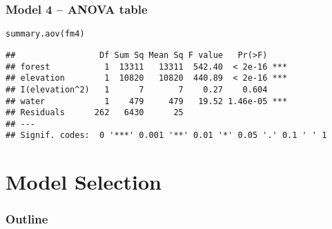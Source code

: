 \documentclass[color=usenames,dvipsnames]{beamer}\usepackage[]{graphicx}\usepackage[]{color}
\makeatletter
\newcommand{\hlstd}[1]{\textcolor[rgb]{0,0,0}{#1}}%
\newcommand{\hlkwd}[1]{\textcolor[rgb]{0.004,0.004,0.506}{#1}}%
\newenvironment{kframe}{%
 \def\at@end@of@kframe{}%
 \ifinner\ifhmode%
  \def\at@end@of@kframe{\end{minipage}}%
  \begin{minipage}{\columnwidth}%
 \fi\fi%
 \def\FrameCommand##1{\hskip\@totalleftmargin \hskip-\fboxsep
 \colorbox{shadecolor}{##1}\hskip-\fboxsep
     \hskip-\linewidth \hskip-\@totalleftmargin \hskip\columnwidth}%
 \MakeFramed {\advance\hsize-\width
   \@totalleftmargin\z@ \linewidth\hsize
   \@setminipage}}%
 {\par\unskip\endMakeFramed%
 \at@end@of@kframe}
\newenvironment{knitrout}{}{} %
\makeatother
\begin{document}
\begin{frame}[fragile]
  \frametitle{Model 4 -- ANOVA table}
\begin{knitrout}\scriptsize
{}\color{fgcolor}\begin{kframe}
\begin{alltt}
\hlkwd{summary.aov}\hlstd{(fm4)}
\end{alltt}
\begin{verbatim}
##                 Df Sum Sq Mean Sq F value   Pr(>F)    
## forest           1  13311   13311  542.40  < 2e-16 ***
## elevation        1  10820   10820  440.89  < 2e-16 ***
## I(elevation^2)   1      7       7    0.27    0.604    
## water            1    479     479   19.52 1.46e-05 ***
## Residuals      262   6430      25                     
## ---
## Signif. codes:  0 '***' 0.001 '**' 0.01 '*' 0.05 '.' 0.1 ' ' 1
\end{verbatim}
\end{kframe}
\end{knitrout}
\end{frame}







\section{Model Selection}






\begin{frame}[plain]
  \frametitle{Outline}
  \huge
  \tableofcontents[currentsection]
\end{frame}
\end{document}
